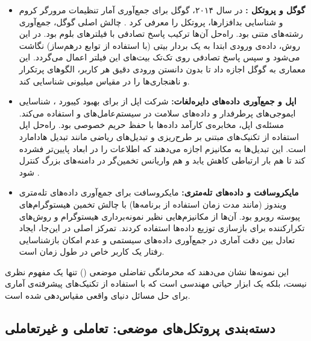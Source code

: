\begin{itemize}
    \item \textbf{گوگل و پروتکل :}
    در سال ۲۰۱۴، گوگل برای جمع‌آوری آمار تنظیمات مرورگر کروم و شناسایی بدافزارها، پروتکل  را معرفی کرد \cite{Wang2020}. چالش اصلی گوگل، جمع‌آوری رشته‌های متنی بود. راه‌حل آن‌ها ترکیب پاسخ تصادفی با فیلترهای بلوم بود.
    در این روش، داده‌ی ورودی ابتدا به یک بردار بیتی (با استفاده از توابع درهم‌ساز) نگاشت می‌شود و سپس پاسخ تصادفی روی تک‌تک بیت‌های این فیلتر اعمال می‌گردد. این معماری به گوگل اجازه داد تا بدون دانستن ورودی دقیق هر کاربر، الگوهای پرتکرار و ناهنجاری‌ها را در مقیاس میلیونی شناسایی کند.

    \item \textbf{اپل و جمع‌آوری داده‌های دایره‌لغات:}
    شرکت اپل از  برای بهبود کیبورد ، شناسایی ایموجی‌های پرطرفدار و داده‌های سلامت در سیستم‌عامل‌های  و  استفاده می‌کند. مسئله‌ی اپل، مخابره‌ی کارآمد داده‌ها با حفظ حریم خصوصی بود.
    راه‌حل اپل استفاده از تکنیک‌های مبتنی بر طرح‌ریزی و تبدیل‌های ریاضی مانند تبدیل هادامارد است. این تبدیل‌ها به مکانیزم اجازه می‌دهند که اطلاعات را در ابعاد پایین‌تر فشرده کند تا هم بار ارتباطی کاهش یابد و هم واریانس تخمین‌گر در دامنه‌های بزرگ کنترل شود \cite{Wang2020}.

    \item \textbf{مایکروسافت و داده‌های تله‌متری:}
    مایکروسافت برای جمع‌آوری داده‌های تله‌متری ویندوز (مانند مدت زمان استفاده از برنامه‌ها) با چالش تخمین هیستوگرام‌های پیوسته روبرو بود. آن‌ها از مکانیزم‌هایی نظیر نمونه‌برداری هیستوگرام و روش‌های تکرار‌کننده برای بازسازی توزیع داده‌ها استفاده کردند. تمرکز اصلی در این‌جا، ایجاد تعادل بین دقت آماری در جمع‌آوری داده‌های سیستمی و عدم امکان بازشناسایی رفتار یک کاربر خاص در طول زمان است.
\end{itemize}


این نمونه‌ها نشان می‌دهند که محرمانگی تفاضلی موضعی () تنها یک مفهوم نظری نیست، بلکه یک ابزار حیاتی مهندسی است که با استفاده از تکنیک‌های پیشرفته‌ی آماری برای حل مسائل دنیای واقعی مقیاس‌دهی شده است.



\subsection{دسته‌بندی پروتکل‌های موضعی: تعاملی و غیرتعاملی}
\label{sec:lit:protocols-types}

